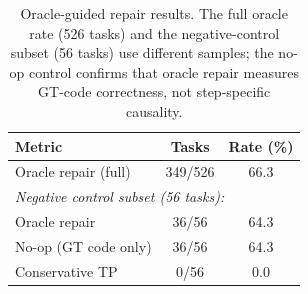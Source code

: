 \begin{table}[t]
\centering
\caption{Oracle-guided repair results. The full oracle rate (526 tasks) and the negative-control subset (56 tasks) use different samples; the no-op control confirms that oracle repair measures GT-code correctness, not step-specific causality.}
\label{tab:oracle-repair}
\small
\begin{tabular}{@{}lcc@{}}
\toprule
Metric & Tasks & Rate (\%) \\
\midrule
Oracle repair (full) & 349/526 & 66.3 \\
\multicolumn{3}{l}{\textit{Negative control subset (56 tasks):}} \\
\quad Oracle repair & 36/56 & 64.3 \\
\quad No-op (GT code only) & 36/56 & 64.3 \\
\quad Conservative TP & 0/56 & 0.0 \\
\bottomrule
\end{tabular}
\end{table}
